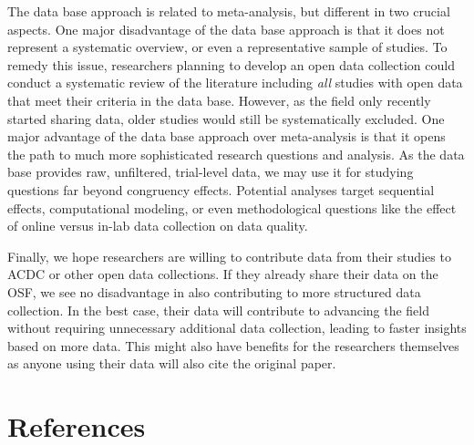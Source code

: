 \documentclass[
  man,floatsintext]{apa6}
\begin{document}
The data base approach is related to meta-analysis, but different in two crucial aspects. One major disadvantage of the data base approach is that it does not represent a systematic overview, or even a representative sample of studies. To remedy this issue, researchers planning to develop an open data collection could conduct a systematic review of the literature including \emph{all} studies with open data that meet their criteria in the data base. However, as the field only recently started sharing data, older studies would still be systematically excluded. One major advantage of the data base approach over meta-analysis is that it opens the path to much more sophisticated research questions and analysis. As the data base provides raw, unfiltered, trial-level data, we may use it for studying questions far beyond congruency effects. Potential analyses target sequential effects, computational modeling, or even methodological questions like the effect of online versus in-lab data collection on data quality.

Finally, we hope researchers are willing to contribute data from their studies to ACDC or other open data collections. If they already share their data on the OSF, we see no disadvantage in also contributing to more structured data collection. In the best case, their data will contribute to advancing the field without requiring unnecessary additional data collection, leading to faster insights based on more data. This might also have benefits for the researchers themselves as anyone using their data will also cite the original paper.

\newpage

\hypertarget{references}{%
\section{References}\label{references}}
\end{document}
